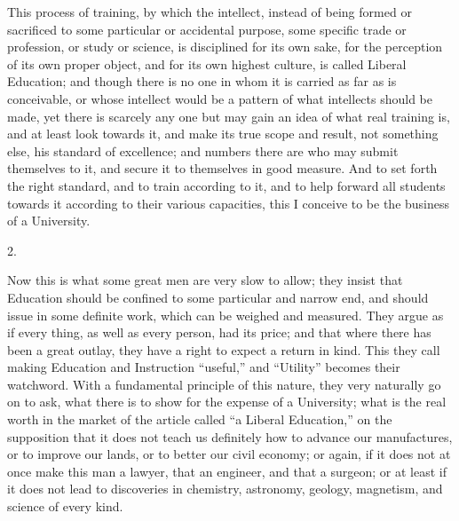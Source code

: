 This process of training, by which the intellect, instead of being
formed or sacrificed to some particular or accidental purpose, some
specific trade or profession, or study or science, is disciplined for
its own sake, for the perception of its own proper object, and for its
own highest culture, is called Liberal Education; and though there is
no one in whom it is carried as far as is conceivable, or whose
intellect would be a pattern of what intellects should be made, yet
there is scarcely any one but may gain an idea of what real training
is, and at least look towards it, and make its true scope and result,
not something else, his standard of excellence; and numbers
there are who may submit themselves to it, and secure it to themselves
in good measure. And to set forth the right standard, and to train
according to it, and to help forward all students towards it according
to their various capacities, this I conceive to be the business of a
University.

2.

Now this is what some great men are very slow to allow; they insist
that Education should be confined to some particular and narrow end,
and should issue in some definite work, which can be weighed and
measured. They argue as if every thing, as well as every person, had
its price; and that where there has been a great outlay, they have a
right to expect a return in kind. This they call making Education and
Instruction ``useful,'' and ``Utility'' becomes their
watchword. With a fundamental principle of this nature, they very
naturally go on to ask, what there is to show for the expense of a
University; what is the real worth in the market of the article called
``a Liberal Education,'' on the supposition that it does not
teach us definitely how to advance our manufactures, or to improve our
lands, or to better our civil economy; or again, if it does not at
once make this man a lawyer, that an engineer, and that a surgeon; or
at least if it does not lead to discoveries in chemistry, astronomy,
geology, magnetism, and science of every kind.

